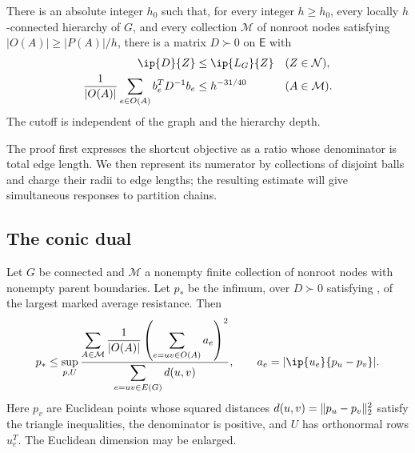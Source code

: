 \begin{theorem}
\label{thm:tg-hierarchy}
There is an absolute integer $h_0$ such that, for every integer
$h\ge h_0$, every locally $h$-connected hierarchy of $G$, and every
collection $\mathcal M$ of nonroot nodes satisfying
$|O(A)|\ge |P(A)|/h$, there is a matrix $D\succ0$ on $\mathsf E$ with
\begin{align}
 \ip{D}{Z}&\le\ip{L_G}{Z} &&(Z\in\mathcal N),\label{tg:shortcut}\\
 \frac1{|O(A)|}\sum_{e\in O(A)}b_e^TD^{-1}b_e
 &\le h^{-31/40} &&(A\in\mathcal M).\label{tg:hierarchy-resistance}
\end{align}
The cutoff is independent of the graph and the hierarchy depth.
\end{theorem}

The proof first expresses the shortcut objective as a ratio whose
denominator is total edge length. We then represent its numerator by
collections of disjoint balls and charge their radii to edge lengths;
the resulting estimate will give simultaneous responses to partition
chains.

\subsection{The conic dual}

\begin{lemma}
\label{tg:dual}
Let $G$ be connected and $\mathcal M$ a nonempty finite collection
of nonroot nodes with nonempty parent boundaries.  Let $p_*$ be the infimum, over
$D\succ0$ satisfying , of the largest marked
average resistance.  Then
\begin{equation}\label{tg:dual-ratio}
 p_*\le \sup_{p,U}
 \frac{\displaystyle\sum_{A\in\mathcal M}\frac1{|O(A)|}
       \left(\sum_{e=uv\in O(A)}a_e\right)^2}
      {\displaystyle\sum_{e=uv\in E(G)}d(u,v)},
 \qquad
 a_e=|\ip{u_e}{p_u-p_v}|.
\end{equation}
Here $p_v$ are Euclidean points whose squared distances
$d(u,v)=\lVert p_u-p_v\rVert_2^2$ satisfy the triangle inequalities, the
denominator is positive, and $U$ has orthonormal rows $u_e^T$.
The Euclidean dimension may be enlarged.
\end{lemma}

